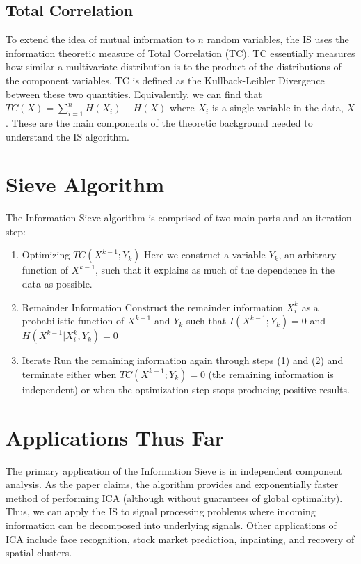 \documentclass[12pt]{article}
\begin{document}
\subsection{Total Correlation}
To extend the idea of mutual information to $n$ random variables, the IS uses the information theoretic measure of Total Correlation (TC). TC essentially measures how similar a multivariate distribution is to the product of the distributions of the component variables. TC is defined as the Kullback-Leibler Divergence between these two quantities. Equivalently, we can find that $TC(X) = \sum_{i =1}^{n}H(X_{i}) - H(X)$ where $X_{i}$ is a single variable in the data, $X$.\newline
These are the main components of the theoretic background needed to understand the IS algorithm. 

\section{Sieve Algorithm}
The Information Sieve algorithm is comprised of two main parts and an iteration step: 
\begin{enumerate}
\item Optimizing \(TC(X^{k-1};Y_k)\) \newline
Here we construct a variable \(Y_k\), an arbitrary function of \(X^{k-1}\), such that it explains as much of the dependence in the data as possible.
\item Remainder Information
\newline
Construct the remainder information \(X_i^k\) as a probabilistic function of \(X^{k-1}\) and \(Y_k\) such that \(I(X^{k-1};Y_k) = 0\) and \(H(X^{k-1}|X_i^k,Y_k) = 0\)
\item Iterate \newline
Run the remaining information again through steps (1) and (2) and terminate either when \(TC(X^{k-1};Y_k)=0\) (the remaining information is independent) or when the optimization step stops producing positive results.
\end{enumerate}

\section{Applications Thus Far}
The primary application of the Information Sieve is in independent component analysis. As the paper claims, the algorithm provides and exponentially faster method of performing ICA (although without guarantees of global optimality). Thus, we can apply the IS to signal processing problems where incoming information can be decomposed into underlying signals. Other applications of ICA include face recognition, stock market prediction, inpainting, and recovery of spatial clusters.\newline
\end{document}
